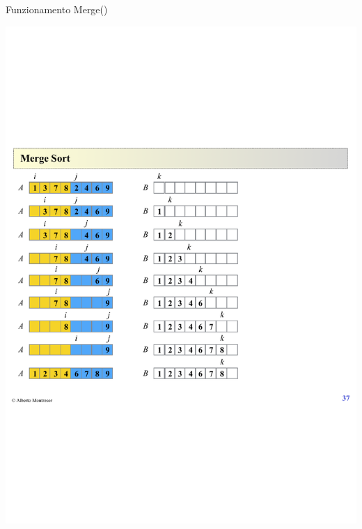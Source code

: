 \begin{frame}{Funzionamento \textsf{Merge}()}

\begin{center}
\includegraphics[width=\textwidth]{merge2.pdf}
\end{center}

\end{frame}

